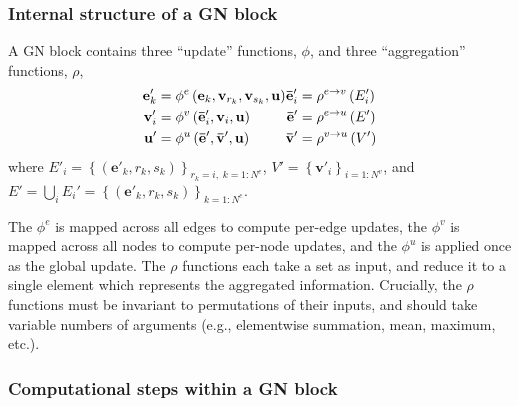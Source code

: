 \subsubsection{Internal structure of a GN block}
A GN block contains three ``update'' functions, $\phi$, and three ``aggregation'' functions, $\rho$,
\begin{align}
  \begin{split}
    \mathbf{e}'_k &= \phi^e\left(\mathbf{e}_k, \mathbf{v}_{r_k}, \mathbf{v}_{s_k}, \mathbf{u} \right) \\
    \mathbf{v}'_i &= \phi^v\left(\mathbf{\bar{e}}'_i, \mathbf{v}_i, \mathbf{u}\right) \\
    \mathbf{u}' &= \phi^u\left(\mathbf{\bar{e}}', \mathbf{\bar{v}}', \mathbf{u}\right)
  \end{split}
  \begin{split}
    \mathbf{\bar{e}}'_i &= \rho^{e \rightarrow v}\left(E'_i\right) \\
    \mathbf{\bar{e}}' &= \rho^{e \rightarrow u}\left(E'\right) \\
    \mathbf{\bar{v}}' &= \rho^{v \rightarrow u}\left(V'\right)   
  \end{split}
  \label{eq:gn-functions}
\end{align}
where $E'_i = \left\{\left(\mathbf{e}'_k, r_k, s_k \right)\right\}_{r_k=i,\; k=1:N^e}$, $V'=\left\{\mathbf{v}'_i\right\}_{i=1:N^v}$, and $E' = \bigcup_i E_i' = \left\{\left(\mathbf{e}'_k, r_k, s_k \right)\right\}_{k=1:N^e}$.

The $\phi^e$ is mapped across all edges to compute per-edge updates, the $\phi^v$ is mapped across all nodes to compute per-node updates, and the $\phi^u$ is applied once as the global update.
%
The $\rho$ functions each take a set as input, and reduce it to a single element which represents the aggregated information. Crucially, the $\rho$ functions must be invariant to permutations of their inputs, and should take variable numbers of arguments (e.g., elementwise summation, mean, maximum, etc.).

\subsubsection{Computational steps within a GN block}

